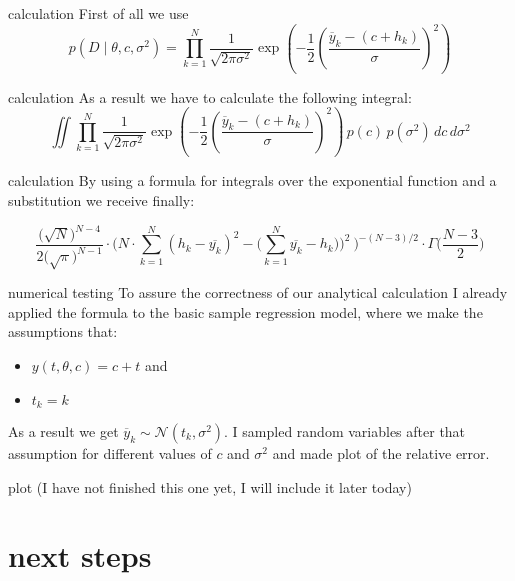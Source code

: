 \documentclass{beamer}
\newcommand{\s}{\sigma^2}
\begin{document}
\begin{frame}{calculation}
	First of all we use
	\[
		p(D \mid \theta,c,\s) = \prod_{k = 1}^N \frac{1}{\sqrt{2 \pi \s}} \exp
		\left(-\frac{1}{2} \left(\frac{\overline{y}_{k} - (c + h_k)}{\sigma}
		\right)^2\right)
	\]
\end{frame}

\begin{frame}{calculation}
	As a result we have to calculate the following integral:
	\[
		\iint \prod_{k = 1}^N \frac{1}{\sqrt{2 \pi \s}} \exp\left(-\frac{1}{2} 
		\left(\frac{\overline{y}_{k} -\left( c + h_{k} \right)}{\sigma}
		 \right)^2\right) \, p(c) \, p(\s) \, dc \, d\s
	\]
\end{frame}

\begin{frame}{calculation}
	By using a formula for integrals over the exponential function and a 
	substitution we receive finally:
	
	\vspace{0.5cm}
	\[
		\frac{\bigl(\sqrt{N}\bigr)^{N-4}}{2\bigl(\sqrt{\pi}\bigr)^{N-1}} \cdot 
		\Biggl(N \cdot \sum_{k = 1}^N (h_k - \overline{y_k})^2 - \Biggl
		(\sum_{k = 1}^N \overline{y_k} - h_k)\Biggr)^2 \ \Biggr)^{-(N-3)/2} 
		\cdot \Gamma \biggl(\frac{N-3}{2}\biggr)
	\]
\end{frame}

\begin{frame}{numerical testing}
	To assure the correctness of our analytical calculation I already applied the 
	formula to the basic sample regression model, where we make the assumptions 
	that:
	\begin{itemize}
		\item $y(t,\theta,c) = c + t$ and
		\item $t_k = k$
	\end{itemize}
	As a result we get $\overline{y}_k \sim \mathcal{N}(t_k,\s)$. I sampled random
	variables after that assumption for different values of $c$ and $\s$ and made 
	plot of the relative error.
\end{frame}

\begin{frame}{plot}
	(I have not finished this one yet, I will include it later today)
\end{frame}

\section{next steps}
\end{document}
